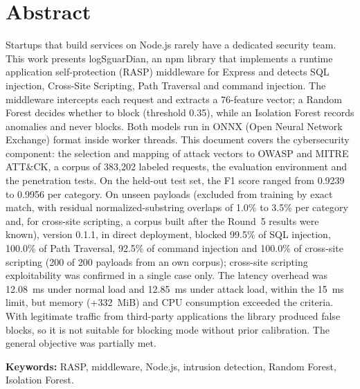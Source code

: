 \ifdefined\modoensamble
\else
	
	\chapter*{Abstract}
\fi

Startups that build services on Node.js rarely have a dedicated security team. This work presents logSguarDian, an npm library that implements a runtime application self-protection (RASP) middleware for Express and detects SQL injection, Cross-Site Scripting, Path Traversal and command injection. The middleware intercepts each request and extracts a 76-feature vector; a Random Forest decides whether to block (threshold 0.35), while an Isolation Forest records anomalies and never blocks. Both models run in ONNX (Open Neural Network Exchange) format inside worker threads. This document covers the cybersecurity component: the selection and mapping of attack vectors to OWASP and MITRE ATT\&CK, a corpus of 383,202 labeled requests, the evaluation environment and the penetration tests. On the held-out test set, the F1 score ranged from 0.9239 to 0.9956 per category. On unseen payloads (excluded from training by exact match, with residual normalized-substring overlaps of 1.0\% to 3.5\% per category and, for cross-site scripting, a corpus built after the Round~5 results were known), version 0.1.1, in direct deployment, blocked 99.5\% of SQL injection, 100.0\% of Path Traversal, 92.5\% of command injection and 100.0\% of cross-site scripting (200 of 200 payloads from an own corpus); cross-site scripting exploitability was confirmed in a single case only. The latency overhead was 12.08~ms under normal load and 12.85~ms under attack load, within the 15~ms limit, but memory (+332~MiB) and CPU consumption exceeded the criteria. With legitimate traffic from third-party applications the library produced false blocks, so it is not suitable for blocking mode without prior calibration. The general objective was partially met.

\medskip
\noindent\textbf{Keywords:} RASP, middleware, Node.js, intrusion detection, Random Forest, Isolation Forest.

\ifdefined\modoensamble
\else
	
\fi

